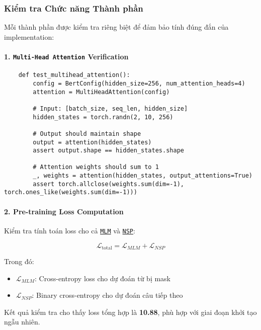     \subsubsection{Kiểm tra Chức năng Thành phần}
    
    Mỗi thành phần được kiểm tra riêng biệt để đảm bảo tính đúng đắn của implementation:
    
    \paragraph{1.
    \texttt{Multi-Head Attention} Verification}
    \begin{verbatim}
    def test_multihead_attention():
        config = BertConfig(hidden_size=256, num_attention_heads=4)
        attention = MultiHeadAttention(config)
        
        # Input: [batch_size, seq_len, hidden_size]
        hidden_states = torch.randn(2, 10, 256)
        
        # Output should maintain shape
        output = attention(hidden_states)
        assert output.shape == hidden_states.shape
        
        # Attention weights should sum to 1
        _, weights = attention(hidden_states, output_attentions=True)
        assert torch.allclose(weights.sum(dim=-1), torch.ones_like(weights.sum(dim=-1)))
    \end{verbatim}
    
    \paragraph{2.
    Pre-training Loss Computation}
    Kiểm tra tính toán loss cho cả \hyperref[acro:mlm]{\texttt{MLM}} và \hyperref[acro:nsp]{\texttt{NSP}}:
    
    \begin{equation}
    \mathcal{L}_{\text{total}} = \mathcal{L}_{MLM} + \mathcal{L}_{NSP}
    \end{equation}
    
    Trong đó:
    \begin{itemize}
        \item $\mathcal{L}_{MLM}$: Cross-entropy loss cho dự đoán từ bị mask
        \item $\mathcal{L}_{NSP}$: Binary cross-entropy cho dự đoán câu tiếp theo
    \end{itemize}
    
    Kết quả kiểm tra cho thấy loss tổng hợp là \textbf{10.88}, phù hợp với giai đoạn khởi tạo ngẫu nhiên.
